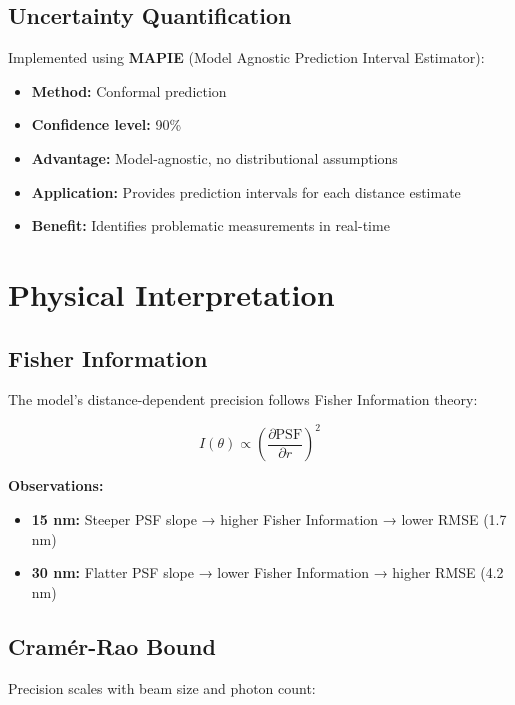 \documentclass[a4paper,11pt]{article}
\begin{document}
\subsection{Uncertainty Quantification}

Implemented using \textbf{MAPIE} (Model Agnostic Prediction Interval Estimator):

\begin{itemize}[leftmargin=*]
    \item \textbf{Method:} Conformal prediction
    \item \textbf{Confidence level:} 90\%
    \item \textbf{Advantage:} Model-agnostic, no distributional assumptions
    \item \textbf{Application:} Provides prediction intervals for each distance estimate
    \item \textbf{Benefit:} Identifies problematic measurements in real-time
\end{itemize}

\section{Physical Interpretation}

\subsection{Fisher Information}

The model's distance-dependent precision follows Fisher Information theory:

\begin{equation}
I(\theta) \propto \left(\frac{\partial \text{PSF}}{\partial r}\right)^2
\end{equation}

\textbf{Observations:}
\begin{itemize}[leftmargin=*]
    \item \textbf{15 nm:} Steeper PSF slope → higher Fisher Information → lower RMSE (1.7 nm)
    \item \textbf{30 nm:} Flatter PSF slope → lower Fisher Information → higher RMSE (4.2 nm)
\end{itemize}

\subsection{Cramér-Rao Bound}

Precision scales with beam size and photon count:
\end{document}
